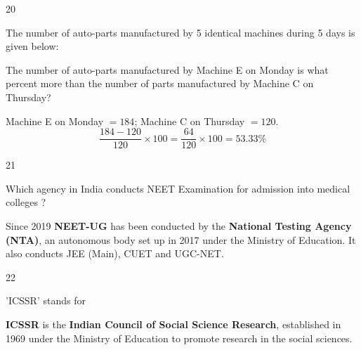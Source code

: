 \begin{question}{20}
{The number of auto-parts manufactured by 5 identical machines during 5 days is given below:\par}
The number of auto-parts manufactured by Machine E on Monday is what percent more than the number of parts manufactured by Machine C on Thursday?
\begin{explain}
Machine E on Monday $=184$; Machine C on Thursday $=120$.
\[\frac{184-120}{120}\times100=\frac{64}{120}\times100=\mathbf{53.33\%}\]
\end{explain}
\end{question}

\begin{question}{21}
{Which agency in India conducts NEET Examination for admission into medical colleges ?\par}
\begin{explain}
Since 2019 \textbf{NEET-UG} has been conducted by the \textbf{National Testing Agency (NTA)}, an autonomous body set up in 2017 under the Ministry of Education. It also conducts JEE (Main), CUET and UGC-NET.
\end{explain}
\end{question}

\begin{question}{22}
{'ICSSR' stands for\par}
\begin{explain}
\textbf{ICSSR} is the \textbf{Indian Council of Social Science Research}, established in 1969 under the Ministry of Education to promote research in the social sciences.
\end{explain}
\end{question}

